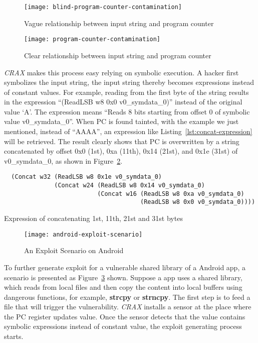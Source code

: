 \begin{figure}[!ht]
  \texttt{[image: blind-program-counter-contamination]}
  \caption{Vague relationship between input string and program counter}
  \label{fig:blind-program-counter-contamination}
\end{figure}

\begin{figure}[!ht]
  \texttt{[image: program-counter-contamination]}
  \caption{Clear relationship between input string and program counter}
  \label{fig:program-counter-contamination}
\end{figure}

\emph{CRAX} makes this process easy relying on symbolic execution. A hacker
first symbolizes the input string, the input string thereby becomes expressions
instead of constant values. For example, reading from the first byte of the
string results in the expression ``(ReadLSB w8 0x0 v0\_symdata\_0)'' instead of
the original value `A'. The expression means ``Reads 8 bits starting from
offset 0 of symbolic value v0\_symdata\_0''. When PC is found tainted, with the
example we just mentioned, instead of ``AAAA'', an expression like
Listing~\ref{lst:concat-expression} will be retrieved. The result clearly shows
that PC is overwritten by a string concatenated by offset 0x0 (1st),
0xa (11th), 0x14 (21st), and 0x1e (31st) of v0\_symdata\_0, as shown in
Figure~\ref{fig:program-counter-contamination}.

\begin{listing}[H]
  \begin{verbatim}
  (Concat w32 (ReadLSB w8 0x1e v0_symdata_0)
              (Concat w24 (ReadLSB w8 0x14 v0_symdata_0)
                          (Concat w16 (ReadLSB w8 0xa v0_symdata_0)
                                      (ReadLSB w8 0x0 v0_symdata_0))))
  \end{verbatim}
  \caption{Expression of concatenating 1st, 11th, 21st and 31st bytes}
  \label{lst:concat-expression}
\end{listing}

\begin{figure}[!ht]
  \texttt{[image: android-exploit-scenario]}
  \caption{An Exploit Scenario on Android}
  \label{fig:android-exploit-scenario}
\end{figure}

To further generate exploit for a vulnerable shared library of a Android app, a
scenario is presented as Figure~\ref{fig:android-exploit-scenario} shown.
Suppose a app uses a shared library, which reads from local files and then copy
the content into local buffers using dangerous functions, for example,
\textbf{strcpy} or \textbf{strncpy}. The first step is to feed a file that will
trigger the vulnerability. \emph{CRAX} installs a sensor at the place where the
PC register updates value. Once the sensor detects that the value contains
symbolic expressions instead of constant value, the exploit generating process
starts.
